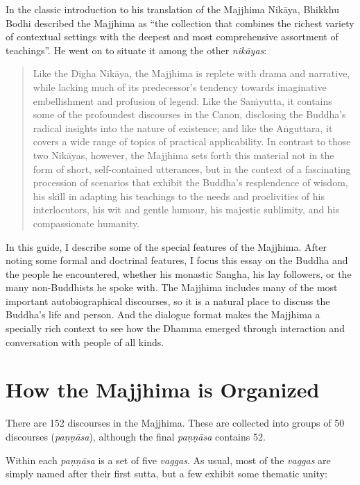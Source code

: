 \documentclass[12pt,openany]{book}%
\begin{document}
In the classic introduction to his translation of the Majjhima \textsanskrit{Nikāya}, Bhikkhu Bodhi described the Majjhima as “the collection that combines the richest variety of contextual settings with the deepest and most comprehensive assortment of teachings”. He went on to situate it among the other \textit{\textsanskrit{nikāyas}}:

\begin{quotation}%
Like the \textsanskrit{Dīgha} \textsanskrit{Nikāya}, the Majjhima is replete with drama and narrative, while lacking much of its predecessor’s tendency towards imaginative embellishment and profusion of legend. Like the \textsanskrit{Saṁyutta}, it contains some of the profoundest discourses in the Canon, disclosing the Buddha’s radical insights into the nature of existence; and like the \textsanskrit{Aṅguttara}, it covers a wide range of topics of practical applicability. In contrast to those two \textsanskrit{Nikāyas}, however, the Majjhima sets forth this material not in the form of short, self-contained utterances, but in the context of a fascinating procession of scenarios that exhibit the Buddha’s resplendence of wisdom, his skill in adapting his teachings to the needs and proclivities of his interlocutors, his wit and gentle humour, his majestic sublimity, and his compassionate humanity.

%
\end{quotation}

In this guide, I describe some of the special features of the Majjhima. After noting some formal and doctrinal features, I focus this essay on the Buddha and the people he encountered, whether his monastic Sangha, his lay followers, or the many non-Buddhists he spoke with. The Majjhima includes many of the most important autobiographical discourses, so it is a natural place to discuss the Buddha’s life and person. And the dialogue format makes the Majjhima a specially rich context to see how the Dhamma emerged through interaction and conversation with people of all kinds.

\section*{How the Majjhima is Organized}

There are 152 discourses in the Majjhima. These are collected into groups of 50 discourses (\textit{\textsanskrit{paṇṇāsa}}), although the final \textit{\textsanskrit{paṇṇāsa}} contains 52.

Within each \textit{\textsanskrit{paṇṇāsa}} is a set of five \textit{vaggas}. As usual, most of the \textit{vaggas} are simply named after their first sutta, but a few exhibit some thematic unity:
\end{document}
